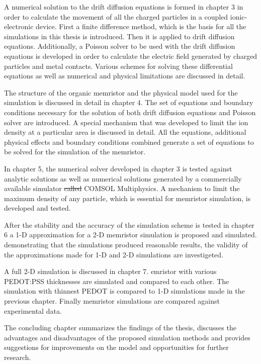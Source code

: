 \begin{doublespace}
A numerical solution to the drift diffusion equations is formed in chapter 3 in order to calculate the movement of all the charged particles in a coupled ionic-electronic device. First a finite difference method, which is the basis for all the simulations in this thesis is introduced. Then it is applied to  drift diffusion equations. Additionally, a Poisson solver to be used with the drift diffusion equations is developed in order to calculate the electric field generated by charged particles and metal contacts. Various schemes for solving these differential equations as well as numerical and physical limitations are discussed in detail.

The structure of the organic memristor and the physical model used for the simulation is discussed in detail in chapter 4. The set of equations and boundary conditions necessary for the solution of both  drift diffusion equations and  Poisson solver are introduced. A special mechanism that was developed to limit the ion density at a particular area is discussed in detail. All the equations, additional physical effects and boundary conditions combined generate a set of equations to be solved for the simulation of the memristor.
 
In chapter 5, the numerical solver developed in chapter 3 is tested against analytic solutions as well as numerical solutions generated by a commercially available simulator \sout{called} \tjs{(}COMSOL Multiphysics\tjs{)}\cite{Comsol}. A mechanism to limit the maximum density of any particle, which is essential for memristor simulation, is developed and tested. 

After the stability and the accuracy of the simulation scheme is tested in chapter 6 a 1-D approximation for a 2-D memristor simulation is proposed and simulated.  demonstrating that the simulations produced reasonable results, the validity of the approximations made for 1-D and 2-D simulations are investigeted.  

A full 2-D simulation is discussed in chapter 7. emristor with various PEDOT:PSS thicknesses are simulated and compared to each other. The simulation with thinnest PEDOT is compared to 1-D simulations made in the previous chapter. Finally memristor simulations are compared against experimental data.

The concluding chapter summarizes the findings of the thesis, discusses the advantages and disadvantages of the proposed simulation methods and provides suggestions for improvements on the model and opportunities for further research.


\end{doublespace}

